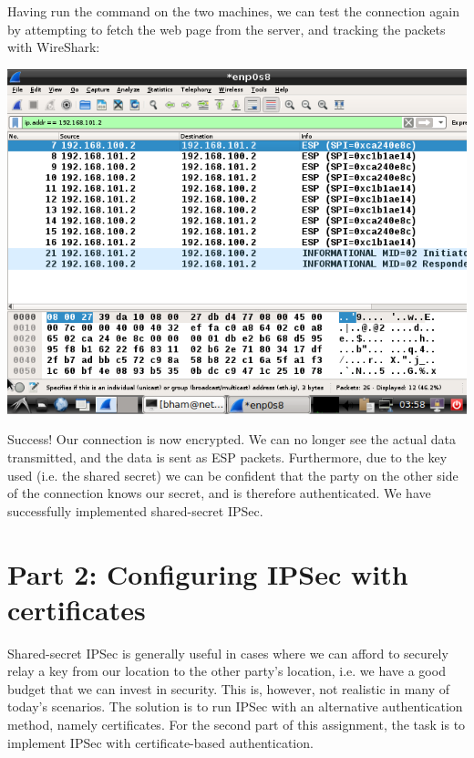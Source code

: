 \documentclass[10pt]{article}\usepackage[]{graphicx}\usepackage[]{color}
\begin{document}
Having run the command on the two machines, we can test the connection again by attempting to fetch the web page from the server, and tracking the packets with WireShark:

\begin{center}
	\includegraphics[scale=0.7]{"ipsec_secure"}
\end{center}

Success! Our connection is now encrypted. We can no longer see the actual data transmitted, and the data is sent as ESP packets. Furthermore, due to the key used (i.e. the shared secret) we can be confident that the party on the other side of the connection knows our secret, and is therefore authenticated. We have successfully implemented shared-secret IPSec.

\section{Part 2: Configuring IPSec with certificates}
Shared-secret IPSec is generally useful in cases where we can afford to securely relay a key from our location to the other party's location, i.e. we have a good budget that we can invest in security. This is, however, not realistic in many of today's scenarios. The solution is to run IPSec with an alternative authentication method, namely certificates. For the second part of this assignment, the task is to implement IPSec with certificate-based authentication.

 

%
\end{document}
